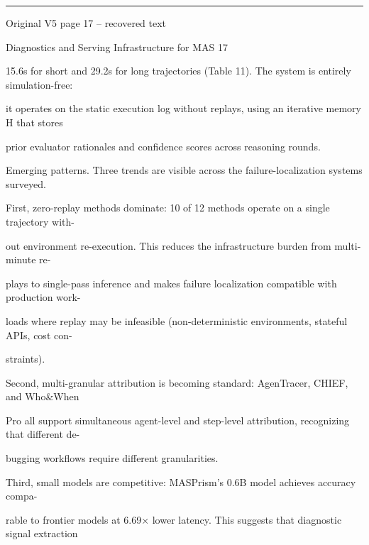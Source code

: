 \par\smallskip\noindent\rule{\textwidth}{0.4pt}\par{\sffamily\footnotesize Original V5 page 17 -- recovered text}\par\begin{flushleft}\footnotesize\ttfamily
\par\smallskip
\par\smallskip
\noindent Diagnostics and Serving Infrastructure for MAS 17\par
\par\smallskip
\par\smallskip
\par\smallskip
\noindent 15.6s for short and 29.2s for long trajectories (Table 11). The system is entirely simulation-free:\par
\noindent it operates on the static execution log without replays, using an iterative memory H that stores\par
\noindent prior evaluator rationales and confidence scores across reasoning rounds.\par
\par\smallskip
\noindent Emerging patterns. Three trends are visible across the failure-localization systems surveyed.\par
\noindent First, zero-replay methods dominate: 10 of 12 methods operate on a single trajectory with-\par
\noindent out environment re-execution. This reduces the infrastructure burden from multi-minute re-\par
\noindent plays to single-pass inference and makes failure localization compatible with production work-\par
\noindent loads where replay may be infeasible (non-deterministic environments, stateful APIs, cost con-\par
\noindent straints).\par
\noindent  Second, multi-granular attribution is becoming standard: AgenTracer, CHIEF, and Who\&When\par
\noindent Pro all support simultaneous agent-level and step-level attribution, recognizing that different de-\par
\noindent bugging workflows require different granularities.\par
\noindent  Third, small models are competitive: MASPrism’s 0.6B model achieves accuracy compa-\par
\noindent rable to frontier models at 6.69× lower latency. This suggests that diagnostic signal extraction\par

\end{flushleft}
